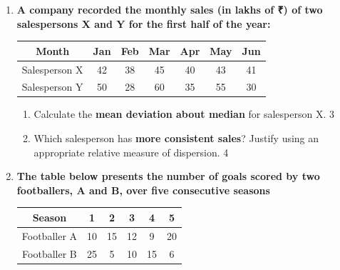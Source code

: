 \documentclass[a4paper,oneside]{book}
\begin{document}
\begin{enumerate}
  
  \begin{enumerate}
    \item
	How is the Range defined? \hfill 1
    \item
	Can the standard deviation exceed the variance? Prove. \hfill 2
    \item  
	Find the standard deviation of the above data and compare the cities. \hfill 3
    \item
	Examine the efficacy the standard deviation in light of the given context. \\ Is a better measure availabe? Analyze. \hfill 4
  \end{enumerate}

        \item
  \textbf{  A company recorded the monthly sales (in lakhs of ₹) of two salespersons X and Y for the first half of the year:}


\begin{table}[h]
\centering
\begin{tabular}{c|cccccc}
Month & Jan & Feb & Mar & Apr & May & Jun \\ \hline
Salesperson X & 42 & 38 & 45 & 40 & 43 & 41 \\
Salesperson Y & 50 & 28 & 60 & 35 & 55 & 30
\end{tabular}
\end{table}

\begin{enumerate}
    \item Calculate the \textbf{mean deviation about median} for salesperson X. \hfill 3
    
    \item Which salesperson has \textbf{more consistent sales}? Justify using an appropriate relative measure of dispersion. \hfill 4
\end{enumerate}


      \item
  \textbf{The table below presents the number of goals scored by two footballers, A and B, over five consecutive seasons}

 \begin{table}[h]
\centering
\begin{tabular}{c|c|c|c|c|c}
Season      & 1  & 2  & 3  & 4  & 5  \\ \hline
Footballer A & 10 & 15 & 12 & 9  & 20 \\ \hline
Footballer B & 25 & 5  & 10 & 15 & 6  
\end{tabular}
\end{table}


\end{enumerate}
\end{document}
